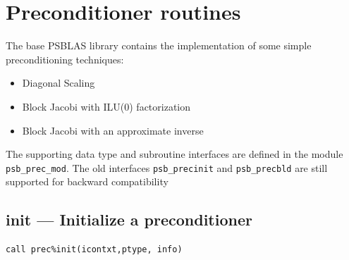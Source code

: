 \section{Preconditioner routines}
\label{sec:precs}

\label{sec:psprecs}
The base PSBLAS library  contains the implementation of some simple
preconditioning techniques:
\begin{itemize}
\item Diagonal Scaling
\item Block Jacobi with ILU(0) factorization
\item Block Jacobi with an approximate inverse
\end{itemize}
The supporting data type and subroutine interfaces are defined in the
module  \verb|psb_prec_mod|.
The old interfaces \verb|psb_precinit| and  \verb|psb_precbld| are still supported for
backward compatibility


\clearpage\subsection{init --- Initialize a  preconditioner}

\begin{verbatim}
call prec%init(icontxt,ptype, info)
\end{verbatim}

